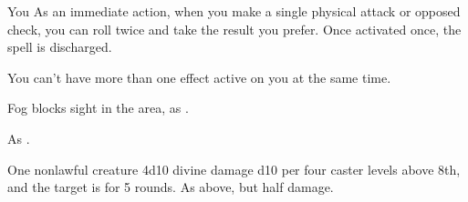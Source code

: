 \begin{spellheader}
\end{spellheader}
\begin{spelleffects}
    \begin{spelltarget}{You}
        \spelleffect As an immediate action, when you make a single physical attack or opposed check, you can roll twice and take the result you prefer. Once activated once, the spell is discharged.
    \end{spelltarget}
\end{spelleffects}
\begin{spellfooter}
    \spellnotes You can't have more than one  effect active on you at the same time.
\end{spellfooter}

\begin{comment}
\subsubsection{O-P}
\end{comment}

\begin{spellheader}
    \spelldur{\durshort}
\end{spellheader}
\begin{spelleffects}
    \spellline
    \spelleffect Fog blocks sight in the area, as .
\end{spelleffects}
\begin{spellfooter}
    \spellnotes As .
\end{spellfooter}

\begin{spellheader}
    \spellrng{\rngmed}
\end{spellheader}
\begin{spelleffects}
    \begin{spelltarget}{One nonlawful creature}
        \spellsuccess 4d10 divine damage \add d10 per four caster levels above 8th, and the target is \bewildered for 5 rounds.
        \spellfailure As above, but half damage.
    \end{spelltarget}
\end{spelleffects}

